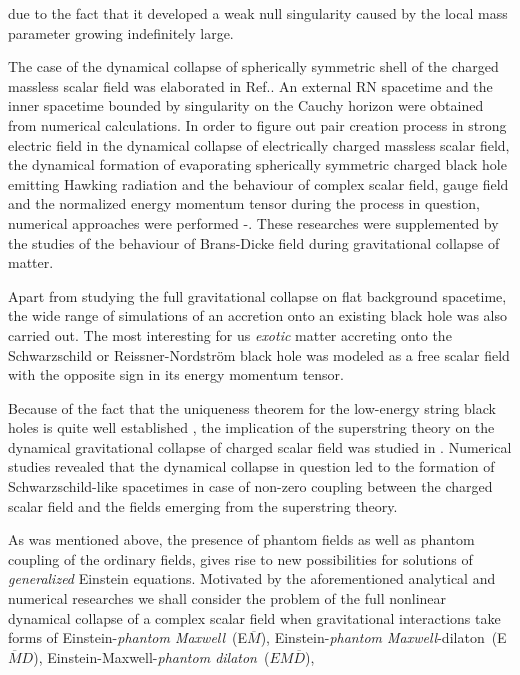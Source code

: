 \documentclass[aps,showpacs,nofootinbib,floatfix]{revtex4}
\begin{document}
due to the fact that it developed a weak null singularity caused by the local mass parameter growing indefinitely
large.
\par
The case of the dynamical collapse of spherically symmetric shell of the charged massless scalar field
was elaborated in Ref.\cite{ore03}. An external RN spacetime and the inner spacetime bounded by singularity
on the Cauchy horizon were obtained from numerical calculations. 
In order to figure out pair creation process in strong electric field in the dynamical collapse
of electrically charged massless scalar field, the dynamical formation of evaporating spherically symmetric
charged black hole emitting Hawking radiation and the behaviour of complex scalar field, gauge field
and the normalized energy momentum tensor during the process in question, numerical approaches
were performed \cite{sor01}-\cite{hwa11}. These researches were supplemented by the studies 
of the behaviour of Brans-Dicke field \cite{hwa10} during gravitational collapse of matter. 
\par
Apart from studying the full gravitational collapse on flat background spacetime, the wide range of simulations 
of an accretion onto an existing black hole was also carried out. The most interesting for us 
{\it exotic} matter accreting onto the Schwarzschild \cite{gon09} or Reissner-Nordstr\"{o}m black hole \cite{dor10}
was modeled as a free scalar field with the opposite sign in its energy momentum tensor.
\par
Because of the fact that 
the uniqueness theorem for the low-energy string black holes is 
quite well established \cite{len},
the implication of the superstring theory on the dynamical gravitational collapse 
of charged scalar field was studied in \cite{bor11}. Numerical studies revealed that the dynamical collapse
in question led to the formation of Schwarzschild-like spacetimes in case of non-zero coupling between 
the charged scalar field and the fields emerging from the superstring theory.
\par
As was mentioned above, the presence of phantom fields as well as phantom coupling of the ordinary
fields, gives rise to new possibilities for solutions of {\it generalized} Einstein equations.
Motivated by the aforementioned analytical and numerical researches we shall consider the problem
of the full nonlinear dynamical collapse of a complex scalar field when gravitational interactions take forms of
Einstein-{\it phantom Maxwell}~(E$\overline{M}$),
Einstein-{\it phantom Maxwell}-dilaton~(E$\overline{M}D$), Einstein-Maxwell-{\it phantom dilaton}~($EM\overline{D}$),
\end{document}
